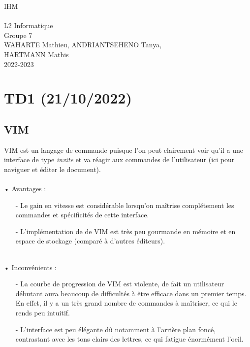 \documentclass{article}
\date{ }
\begin{document}
\begin{titlepage}

\begin{center}
    \vspace*{5cm}
    \huge IHM\\
    \text{ }\\
    \LARGE L2 Informatique\\
    \vfill
    \LARGE Groupe 7\\
    \LARGE WAHARTE Mathieu, ANDRIANTSEHENO Tanya,\\ HARTMANN Mathis\\
    \Large 2022-2023\\
\end{center}

\end{titlepage}

\newpage


\section{TD1 (21/10/2022)}

\subsection{VIM}
\quad VIM est un langage de commande puisque l'on peut clairement voir qu'il a une interface de type \textit{invite} et va réagir aux commandes de l'utilisateur (ici pour naviguer et éditer le document).
\text{ }\\
\text{ }\\
• Avantages :
\begin{itemize}
    \item[-] Le gain en vitesse est considérable lorsqu'on maîtrise complétement les commandes et spécificités de cette interface.
    \item[-] L'implémentation de de VIM est très peu gourmande en mémoire et en espace de stockage (comparé à d'autres éditeurs).
\end{itemize}
\text{ }\\
• Inconvénients :
\begin{itemize}
    \item[-] La courbe de progression de VIM est violente, de fait un utilisateur débutant aura beaucoup de difficultés à être efficace dans un premier temps.
    En effet, il y a un très grand nombre de commandes à maîtriser, ce qui le rends peu intuitif.
    \item[-] L'interface est peu élégante dû notamment à l'arrière plan foncé, contrastant avec les tons clairs des lettres, ce qui fatigue énormément l'oeil.
\end{itemize}
\end{document}
